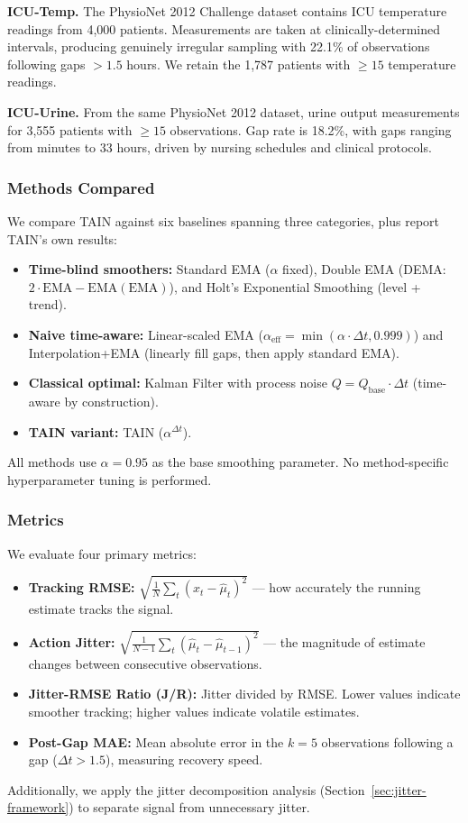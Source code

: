 \documentclass[11pt,a4paper]{article}
\begin{document}
\textbf{ICU-Temp.} The PhysioNet 2012 Challenge dataset \citep{physionet2012} contains ICU temperature readings from 4{,}000 patients. Measurements are taken at clinically-determined intervals, producing genuinely irregular sampling with 22.1\% of observations following gaps $> 1.5$ hours. We retain the 1{,}787 patients with $\geq 15$ temperature readings.

\textbf{ICU-Urine.} From the same PhysioNet 2012 dataset, urine output measurements for 3{,}555 patients with $\geq 15$ observations. Gap rate is 18.2\%, with gaps ranging from minutes to 33 hours, driven by nursing schedules and clinical protocols.

\subsubsection{Methods Compared}

We compare TAIN against six baselines spanning three categories, plus report TAIN's own results:

\begin{itemize}
\item \textbf{Time-blind smoothers:} Standard EMA ($\alpha$ fixed), Double EMA
(DEMA: $2 \cdot \text{EMA} - \text{EMA}(\text{EMA})$), and Holt's Exponential
Smoothing (level + trend).
\item \textbf{Naive time-aware:} Linear-scaled EMA
($\alpha_{\text{eff}} = \min(\alpha \cdot \Delta t, 0.999)$) and
Interpolation+EMA (linearly fill gaps, then apply standard EMA).
\item \textbf{Classical optimal:} Kalman Filter with process noise
$Q = Q_{\text{base}} \cdot \Delta t$ (time-aware by construction).
\item \textbf{TAIN variant:} TAIN ($\alpha^{\Delta t}$).
\end{itemize}

All methods use $\alpha = 0.95$ as the base smoothing parameter. No method-specific
hyperparameter tuning is performed.

\subsubsection{Metrics}

We evaluate four primary metrics:
\begin{itemize}
\item \textbf{Tracking RMSE:} $\sqrt{\frac{1}{N}\sum_{t}(x_t - \hat{\mu}_t)^2}$
--- how accurately the running estimate tracks the signal.
\item \textbf{Action Jitter:} $\sqrt{\frac{1}{N-1}\sum_{t}(\hat{\mu}_t - \hat{\mu}_{t-1})^2}$
--- the magnitude of estimate changes between consecutive observations.
\item \textbf{Jitter-RMSE Ratio (J/R):} Jitter divided by RMSE. Lower values
indicate smoother tracking; higher values indicate volatile estimates.
\item \textbf{Post-Gap MAE:} Mean absolute error in the $k=5$ observations
following a gap ($\Delta t > 1.5$), measuring recovery speed.
\end{itemize}
Additionally, we apply the jitter decomposition analysis
(Section~\ref{sec:jitter-framework}) to separate signal from unnecessary jitter.
\end{document}

